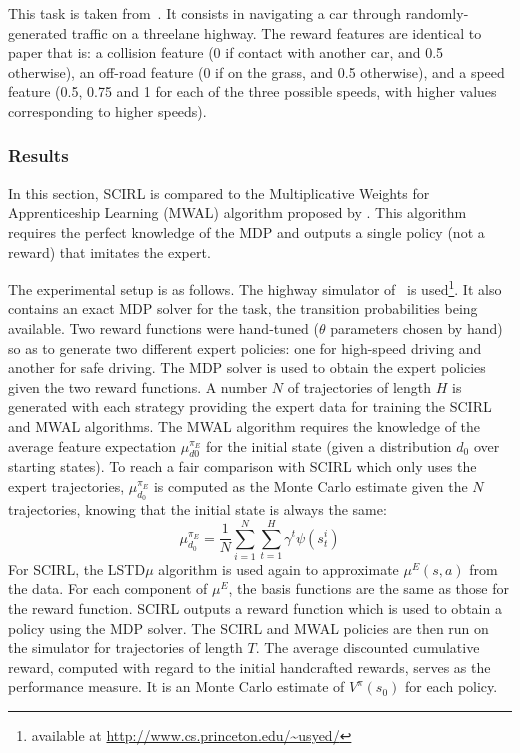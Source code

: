 \documentclass{article}
\begin{document}
This task is taken from~\cite{syed2008game}. It consists in
navigating a car through randomly-generated traffic on a threelane
highway. The reward features are identical to~\citet{syed2008game}
paper that is: a collision feature (0 if contact with another car,
and 0.5 otherwise), an off-road feature (0 if on the grass, and 0.5
otherwise), and a speed feature (0.5, 0.75 and 1 for each of the
three possible speeds, with higher values corresponding to higher
speeds).

\subsubsection{Results}

In this section, SCIRL is compared to the Multiplicative Weights for
Apprenticeship Learning (MWAL) algorithm proposed by
\citet{syed2008game}. This algorithm requires the perfect knowledge
of the MDP and outputs a single policy (not a reward) that imitates
the expert.

The experimental setup is as follows. The highway simulator
of~\cite{syed2008game} is used\footnote{available at \url{
http://www.cs.princeton.edu/~usyed/}}. It also contains an exact MDP
solver for the task, the transition probabilities being available.
Two reward functions were hand-tuned ($\theta$ parameters chosen by
hand) so as to generate two different expert policies: one for
high-speed driving and another for safe driving. The MDP solver is
used to obtain the expert policies given the two reward functions. A
number $N$ of trajectories of length $H$ is generated with each
strategy providing the expert data for training the SCIRL and MWAL
algorithms. The MWAL algorithm requires the knowledge of the average
feature expectation $\mu_{d0}^{\pi_E}$ for the initial state (given
a distribution $d_0$ over starting states). To reach a fair
comparison with SCIRL which only uses the expert trajectories,
$\mu_{d_0}^{\pi_E}$ is computed as the Monte Carlo estimate given
the $N$ trajectories, knowing that the initial state is always the
same:
%
$$\mu_{d_0}^{\pi_E} = \frac{1}{N}\sum_{i=1}^N \sum_{t=1}^H \gamma^t \psi(s_t^i)$$
%
For SCIRL, the LSTD$\mu$ algorithm is used again to approximate
$\mu^E(s,a)$ from the data. For each component of $\mu^E$, the basis
functions are the same as those for the reward function. SCIRL
outputs a reward function which is used to obtain a policy using the
MDP solver. The SCIRL and MWAL policies are then run on the
simulator for trajectories of length $T$. The average discounted
cumulative reward, computed with regard to the initial handcrafted
rewards, serves as the performance measure. It is an Monte Carlo
estimate of $V^\pi(s_0)$ for each policy.
\end{document}
